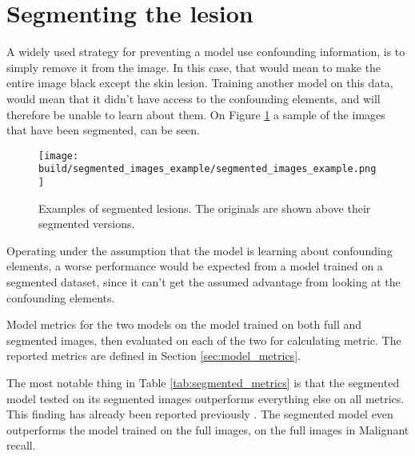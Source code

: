 \section{Segmenting the lesion}
A widely used strategy for preventing a model use confounding information, is to simply remove it from the image.
In this case, that would mean to make the entire image black except the skin lesion.
Training another model on this data, would mean that it didn't have access to the confounding elements,
and will therefore be unable to learn about them.
On Figure \ref{fig:segmented_images_example} a sample of the images that have been segmented,
can be seen.

\begin{figure}[h]
    \centering
    \texttt{[image: 
        build/segmented\_images\_example/segmented\_images\_example.png
    ]}
    \caption{Examples of segmented lesions. The originals are shown above their segmented versions.}
    \label{fig:segmented_images_example}
\end{figure}

Operating under the assumption that the model is learning about confounding elements,
a worse performance would be expected from a model trained on a segmented dataset,
since it can't get the assumed advantage from looking at the confounding elements.

\begin{table}
    
    \caption[Model metrics for model trained on both full and segmented images]{
        Model metrics for the two models on the model trained on both full and segmented images,
        then evaluated on each of the two for calculating metric.
        The reported metrics are defined in Section \ref{sec:model_metrics}.
    }
    \label{tab:segmented_metrics}
\end{table}

The most notable thing in Table \ref{tab:segmented_metrics} is that the segmented model tested
on its segmented images outperforms everything else on all metrics.
This finding has already been reported previously \cite{segmenting-improves-performance}.
The segmented model even outperforms the model trained on the full images, on the full images in Malignant recall.

